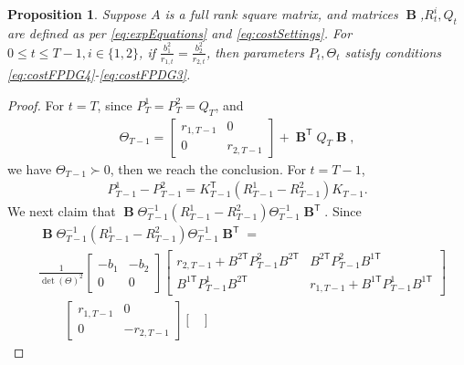 \documentclass[letterpaper, 10 pt, conference]{ieeeconf}  %
\newcommand{\transpose}{\mathsf{T}}
\DeclareMathOperator{\contB}{\mathbf{B}}
\newtheorem{proposition}{Proposition}
\begin{document}
\begin{proposition}
    Suppose $A$ is a full rank square matrix, and matrices $\contB$,$R_{t}^{i},Q_{t}$ are defined as per \eqref{eq:expEquations} and \eqref{eq:costSettings}.
    For $0 \leq t \leq T-1, i\in \{1,2\}$, if $\frac{b_{1}^{2}}{r_{1,t}} = \frac{b_{2}^{2}}{r_{2,t}}$, then parameters $P_{t},\Theta_{t}$ satisfy conditions \eqref{eq:costFPDG4}-\eqref{eq:costFPDG3}.
    
\end{proposition}
\begin{proof}
    For $t = T$, since $P_{T}^{1} = P_{T}^{2} = Q_{T}$, and
    \begin{align*}
        \Theta_{T-1} = 
        \begin{bmatrix}
            r_{1,T-1} & 0\\
            0 & r_{2,T-1}
        \end{bmatrix}
        + \contB^{\transpose}Q_{T}\contB,
    \end{align*}
    we have 
    $\Theta_{T-1} \succ 0 $, then we reach the conclusion.
    For $t = T-1$, 
    \begin{align*}
        P_{T-1}^{1}-P_{T-1}^{2} = K_{T-1}^{\transpose}(R_{T-1}^{1}-R_{T-1}^{2})K_{T-1}.
    \end{align*}
    We next claim that $\contB\Theta_{T-1}^{-1}(R_{T-1}^{1}-R_{T-1}^{2})\Theta_{T-1}^{-1}\contB^{\transpose}$.
    Since
    \begin{align*}
        &\contB\Theta_{T-1}^{-1}(R_{T-1}^{1}-R_{T-1}^{2})\Theta_{T-1}^{-1}\contB^{\transpose} = \\
        &\frac{1}{\det(\Theta)^{2}}
        \begin{bmatrix}
            -b_{1} & -b_{2}\\
            0 & 0
        \end{bmatrix}
        \begin{bmatrix}
            r_{2,T-1}+B^{2\transpose}P_{T-1}^{2}B^{2\transpose} & B^{2\transpose}P_{T-1}^{2}B^{1\transpose}\\
            B^{1\transpose}P_{T-1}^{1}B^{2\transpose} & r_{1,T-1}+B^{1\transpose}P_{T-1}^{1}B^{1\transpose}
        \end{bmatrix}\\
        &\qquad 
        \begin{bmatrix}
            r_{1,T-1} & 0\\
            0 & -r_{2,T-1}
        \end{bmatrix}
        \begin{bmatrix}

\end{bmatrix}
\end{align*}
\end{proof}
\end{document}
